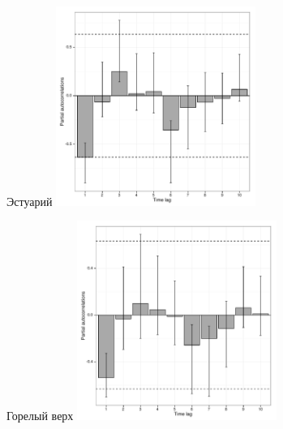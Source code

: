 \documentclass[12pt, a4paper]{disser}
\begin{document}
	\begin{figure}[ht]
	
	\begin{minipage}[b]{.46\linewidth}
	\begin{center}
	{\tiny Эстуарий}
		\includegraphics[width=65mm]{../White_Sea/dynamic_N_N1/boot_PRCF_Estuary_.pdf}

	\end{center}
	\end{minipage}
	\hfil %
	\begin{minipage}[b]{.46\linewidth}
	\begin{center}
	{\tiny Горелый верх}
		\includegraphics[width=65mm]{../White_Sea/dynamic_N_N1/boot_PRCF_Goreliy_high_.pdf}
	\end{center}
	\end{minipage}




\end{figure}
\end{document}
